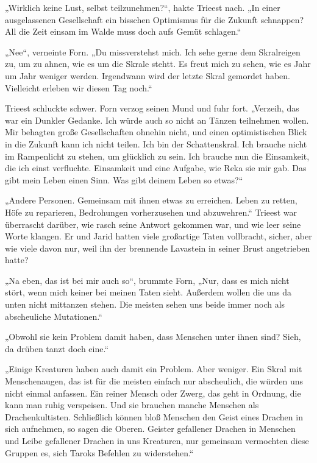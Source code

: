 „Wirklich keine Lust, selbst teilzunehmen?“, hakte Trieest nach. „In einer ausgelassenen Gesellschaft ein bisschen Optimismus für die Zukunft schnappen? All die Zeit einsam im Walde muss doch aufs Gemüt schlagen.“

„Nee“, verneinte Forn. „Du missverstehst mich. Ich sehe gerne dem Skralreigen zu, um zu ahnen, wie es um die Skrale stehtt. Es freut mich zu sehen, wie es Jahr um Jahr weniger werden. Irgendwann wird der letzte Skral gemordet haben. Vielleicht erleben wir diesen Tag noch.“

Trieest schluckte schwer. Forn verzog seinen Mund und fuhr fort. „Verzeih, das war ein Dunkler Gedanke. Ich würde auch so nicht an Tänzen teilnehmen wollen. Mir behagten große Gesellschaften ohnehin nicht, und einen optimistischen Blick in die Zukunft kann ich nicht teilen. Ich bin der Schattenskral. Ich brauche nicht im Rampenlicht zu stehen, um glücklich zu sein. Ich brauche nun die Einsamkeit, die ich einst verfluchte. Einsamkeit und eine Aufgabe, wie Reka sie mir gab. Das gibt mein Leben einen Sinn. Was gibt deinem Leben so etwas?“

„Andere Personen. Gemeinsam mit ihnen etwas zu erreichen. Leben zu retten, Höfe zu reparieren, Bedrohungen vorherzusehen und abzuwehren.“ Trieest war überrascht darüber, wie rasch seine Antwort gekommen war, und wie leer seine Worte klangen. Er und Jarid hatten viele großartige Taten vollbracht, sicher, aber wie viele davon nur, weil ihn der brennende Lavastein in seiner Brust angetrieben hatte?

„Na eben, das ist bei mir auch so“, brummte Forn, „Nur, dass es mich nicht stört, wenn mich keiner bei meinen Taten sieht. Außerdem wollen die uns da unten nicht mittanzen stehen. Die meisten sehen uns beide immer noch als abscheuliche Mutationen.“

„Obwohl sie kein Problem damit haben, dass Menschen unter ihnen sind? Sieh, da drüben tanzt doch eine.“

„Einige Kreaturen haben auch damit ein Problem. Aber weniger. Ein Skral mit Menschenaugen, das ist für die meisten einfach nur abscheulich, die würden uns nicht einmal anfassen. Ein reiner Mensch oder Zwerg, das geht in Ordnung, die kann man ruhig verspeisen. Und sie brauchen manche Menschen als Drachenkultisten. Schließlich können bloß Menschen den Geist eines Drachen in sich aufnehmen, so sagen die Oberen. Geister gefallener Drachen in Menschen und Leibe gefallener Drachen in uns Kreaturen, nur gemeinsam vermochten diese Gruppen es, sich Taroks Befehlen zu widerstehen.“

